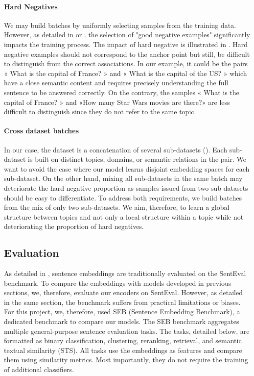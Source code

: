 \paragraph{Hard Negatives} We may build batches by uniformly selecting samples from the training data. However, as detailed in \textcite{robinson_21} or \textcite{qu_21}. the selection of "good negative examples" significantly impacts the training process. The impact of hard negative is illustrated in .
Hard negative examples should not correspond to the anchor point but still, be difficult to distinguish from the correct associations. 
In our example, it could be the pairs « What is the capital of France? » and « What is the capital of the US? » which have a close semantic content and requires precisely understanding the full sentence to be answered correctly. On the contrary, the samples « What is the capital of France? » and «How many Star Wars movies are there?» are less difficult to distinguish since they do not refer to the same topic.

\paragraph{Cross dataset batches} In our case, the dataset is a concatenation of several sub-datasets (). Each sub-dataset is built on distinct topics, domains, or semantic relations in the pair. We want to avoid the case where our model learns disjoint embedding spaces for each sub-dataset. On the other hand, mixing all sub-datasets in the same batch may deteriorate the hard negative proportion as samples issued from two sub-datasets should be easy to differentiate. To address both requirements, we build batches from the mix of only two sub-datasets. We aim, therefore, to learn a global structure between topics and not only a local structure within a topic while not deteriorating the proportion of hard negatives.

\subsection{Evaluation}

As detailed in , sentence embeddings are traditionally evaluated on the SentEval benchmark. To compare the embeddings with models developed in previous sections, we, therefore, evaluate our encoders on SentEval. However, as detailed in the same section, the benchmark suffers from practical limitations or biases. For this project, we, therefore, used SEB (Sentence Embedding Benchmark), a dedicated benchmark to compare our models. The SEB benchmark aggregates multiple general-purpose sentence evaluation tasks. The tasks, detailed below, are formatted as binary classification, clustering, reranking, retrieval, and semantic textual similarity (STS). All tasks use the embeddings as features and compare them using similarity metrics. Most importantly, they do not require the training of additional classifiers.

